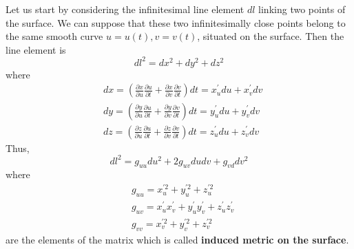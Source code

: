 Let us start by considering the infinitesimal line element $dl$ linking two points of the surface. We can suppose that these two infinitesimally close points belong to the same smooth curve $u=u(t),v=v(t)$, situated on the surface. Then the line element is
$$
d l^{2}=d x^{2}+d y^{2}+d z^{2}
$$
where
$$
\begin{aligned}
&d x=\left(\frac{\partial x}{\partial u} \frac{\partial u}{\partial t}+\frac{\partial x}{\partial v} \frac{\partial v}{\partial t}\right) d t=x_{u}^{\prime} d u+x_{v}^{\prime} d v\\
&d y=\left(\frac{\partial y}{\partial u} \frac{\partial u}{\partial t}+\frac{\partial y}{\partial v} \frac{\partial v}{\partial t}\right) d t=y_{u}^{\prime} d u+y_{v}^{\prime} d v\\
&d z=\left(\frac{\partial z}{\partial u} \frac{\partial u}{\partial t}+\frac{\partial z}{\partial v} \frac{\partial v}{\partial t}\right) d t=z_{u}^{\prime} d u+z_{v}^{\prime} d v
\end{aligned}
$$
Thus, 
\begin{equation}
dl^2=g_{u u} d u^{2}+2 g_{u v} d u d v+g_{v d} d v^{2}
\end{equation}
where
\begin{equation}
\begin{aligned}
&g_{u u}=x_{u}^{\prime 2}+y_{u}^{\prime 2}+z_{u}^{\prime 2}\\
&g_{u v}=x_{u}^{\prime} x_{v}^{\prime}+y_{u}^{\prime} y_{v}^{\prime}+z_{u}^{\prime} z_{v}^{\prime}\\
&g_{vv}=x_{v}^{\prime 2}+y_{v}^{\prime 2}+z_{v}^{\prime 2}
\end{aligned}
\end{equation}
are the elements of the matrix which is called \textbf{induced metric on the surface}.

